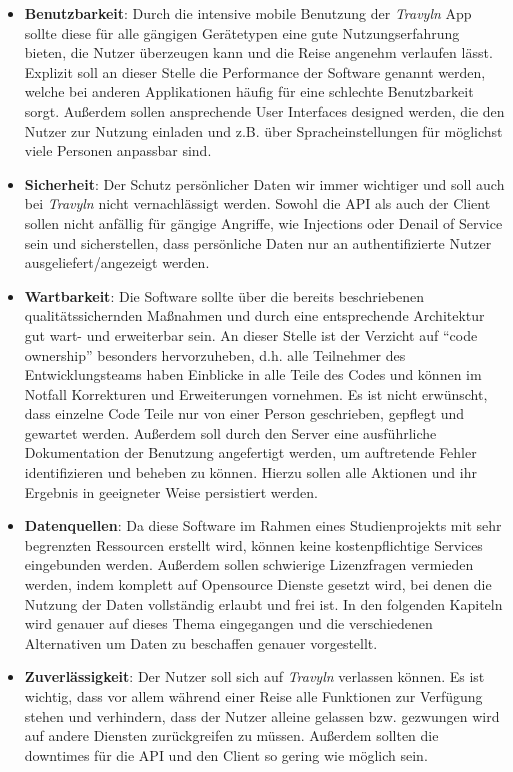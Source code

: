 \begin{itemize}
	\item \textbf{Benutzbarkeit}: Durch die intensive mobile Benutzung der \textit{Travyln} App sollte diese für alle gängigen Gerätetypen eine gute Nutzungserfahrung bieten, die Nutzer überzeugen kann und die Reise angenehm verlaufen lässt. Explizit soll an dieser Stelle die Performance der Software genannt werden, welche bei anderen Applikationen häufig für eine schlechte Benutzbarkeit sorgt. Außerdem sollen ansprechende User Interfaces designed werden, die den Nutzer zur Nutzung einladen und z.B. über Spracheinstellungen für möglichst viele Personen anpassbar sind.
	\item \textbf{Sicherheit}: Der Schutz persönlicher Daten wir immer wichtiger und soll auch bei \textit{Travyln} nicht vernachlässigt werden. Sowohl die API als auch der Client sollen nicht anfällig für gängige Angriffe, wie Injections oder Denail of Service sein und sicherstellen, dass persönliche Daten nur an authentifizierte Nutzer ausgeliefert/angezeigt werden.
	\item \textbf{Wartbarkeit}: Die Software sollte über die bereits beschriebenen qualitätssichernden Maßnahmen und durch eine entsprechende Architektur gut wart- und erweiterbar sein. An dieser Stelle ist der Verzicht auf \enquote{code ownership} besonders hervorzuheben, d.h. alle Teilnehmer des Entwicklungsteams haben Einblicke in alle Teile des Codes und können im Notfall Korrekturen und Erweiterungen vornehmen. Es ist nicht erwünscht, dass einzelne Code Teile nur von einer Person geschrieben, gepflegt und gewartet werden. Außerdem soll durch den Server eine ausführliche Dokumentation der Benutzung angefertigt werden, um auftretende Fehler identifizieren und beheben zu können. Hierzu sollen alle Aktionen und ihr Ergebnis in geeigneter Weise persistiert werden.
	\item \textbf{Datenquellen}: Da diese Software im Rahmen eines Studienprojekts mit sehr begrenzten Ressourcen erstellt wird, können keine kostenpflichtige Services eingebunden werden. Außerdem sollen schwierige Lizenzfragen vermieden werden, indem komplett auf Opensource Dienste gesetzt wird, bei denen die Nutzung der Daten vollständig erlaubt und frei ist. In den folgenden Kapiteln wird genauer auf dieses Thema eingegangen und die verschiedenen Alternativen um Daten zu beschaffen genauer vorgestellt.
	\item \textbf{Zuverlässigkeit}: Der Nutzer soll sich auf \textit{Travyln} verlassen können. Es ist wichtig, dass vor allem während einer Reise alle Funktionen zur Verfügung stehen und verhindern, dass der Nutzer alleine gelassen bzw. gezwungen wird auf andere Diensten zurückgreifen zu müssen.
	Außerdem sollten die downtimes für die API und den Client so gering wie möglich sein.
\end{itemize} 